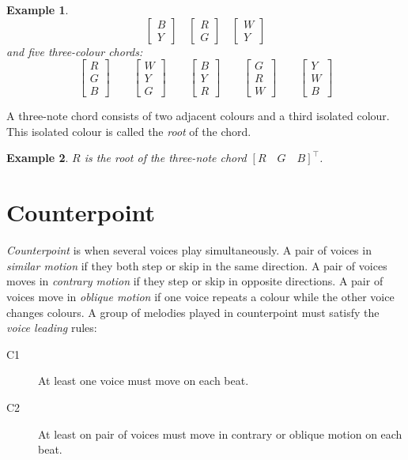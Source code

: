 \documentclass{scrartcl}
\newtheorem{example}{Example}
\begin{document}
\begin{example}
\begin{equation}
\begin{bmatrix}
B \\ Y
\end{bmatrix}
\quad
\begin{bmatrix}
R \\ G
\end{bmatrix}
\quad
\begin{bmatrix}
W \\ Y
\end{bmatrix}
\end{equation}
and five three-colour chords:
\begin{equation}\nonumber
\begin{bmatrix}
R \\ G \\ B
\end{bmatrix}
\qquad
\begin{bmatrix}
W \\ Y \\ G
\end{bmatrix}
\qquad
\begin{bmatrix}
B \\ Y \\ R
\end{bmatrix}
\qquad
\begin{bmatrix}
G \\ R \\ W
\end{bmatrix}
\qquad
\begin{bmatrix}
Y \\ W \\ B
\end{bmatrix}
\end{equation}
\end{example}
A three-note chord consists of two adjacent colours and a third isolated colour. This isolated colour is called the \emph{root} of the chord.
\begin{example}
$R$ is the root of the three-note chord $\left[R \quad G \quad B\right]^{\top}$.
\end{example}

\section{Counterpoint}
\emph{Counterpoint} is when several voices play simultaneously. A pair of voices in \emph{similar motion} if they both step or skip in the same direction. A pair of voices moves in \emph{contrary motion} if they step or skip in opposite directions.  A pair of voices move in \emph{oblique motion} if one voice repeats a colour while the other voice changes colours.  A group of melodies played in counterpoint must satisfy the \emph{voice leading} rules:
\begin{description}
	\item[C1] At least one voice must move on each beat.
	\item[C2] At least on pair of voices must move in contrary or oblique motion on each beat.
\end{description}
\end{document}
